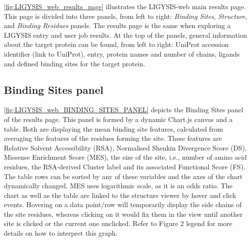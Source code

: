 \autoref{fig:LIGYSIS_web_results_page} illustrates the LIGYSIS-web main results page. This page is divided into three panels, from left to right: \textit{Binding Sites}, \textit{Structure}, and \textit{Binding Residues} panels. The results page is the same when exploring a LIGYSIS entry and user job results. At the top of the panels, general information about the target protein can be found, from left to right: UniProt accession identifier (link to UniProt), entry, protein names and number of chains, ligands and defined binding sites for the target protein.

\subsection{Binding Sites panel}

\autoref{fig:LIGYSIS_web_BINDING_SITES_PANEL} depicts the Binding Sites panel of the results page. This panel is formed by a dynamic Chart.js canvas and a table. Both are displaying the mean binding site features, calculated from averaging the features of the residues forming the site. These features are Relative Solvent Accessibility (RSA), Normalised Shenkin Divergence Score (DS), Missense Enrichment Score (MES), the size of the site, i.e., number of amino acid residues, the RSA-derived Cluster label and its associated Functional Score (FS). The table rows can be sorted by any of these variables and the axes of the chart dynamically changed. MES uses logarithmic scale, as it is an odds ratio. The chart as well as the table are linked to the structure viewer by hover and click events. Hovering on a data point/row will temporarily display the side chains of the site residues, whereas clicking on it would fix them in the view until another site is clicked or the current one unclicked. Refer to Figure 2 legend for more details on how to interpret this graph.

